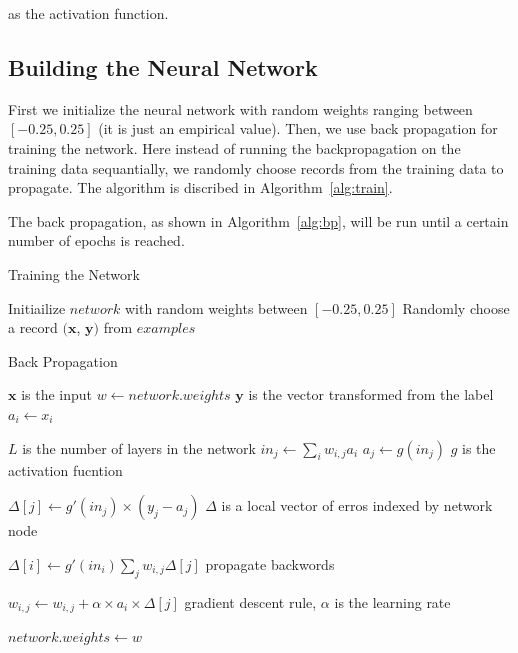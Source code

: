 \documentclass{article}
\begin{document}
as the activation function.

\subsection{Building the Neural Network}

First we initialize the neural network with random weights ranging between $[-0.25, 0.25]$ (it is just an empirical value). Then, we use back propagation for training the network. Here instead of running the backpropagation on the training data sequantially, we randomly choose records from the training data to propagate. The algorithm is discribed in Algorithm~\ref{alg:train}.

The back propagation, as shown in Algorithm~\ref{alg:bp}, will be run until a certain number of epochs is reached.

\begin{algorithm}[H]
\centering
\caption{Training the Network}
\label{alg:train}
  \begin{algorithmic}[1]
    	\State Initiailize $network$ with random weights between $[-0.25, 0.25]$
   	    	\State Randomly choose a record $(\mathbf{x}$, $\mathbf{y})$ from $examples$
   	    	\State {}
    	\EndFor
    \EndFunction
  \end{algorithmic}
\end{algorithm}

\begin{algorithm}[H]
\centering
\caption{Back Propagation}
\label{alg:bp}
  \begin{algorithmic}[1]
    	\Comment $\mathbf{x}$ is the input
    	\State $w \gets network.weights$ \Comment $\mathbf{y}$ is the vector transformed from the label
    		\State $a_i \gets x_i$
    	\EndFor
    	
    	  \Comment $L$ is the number of layers in the network
    			\State $in_j \gets \sum_i w_{i,j}a_i$
    			\State $a_j \gets g(in_j)$  \Comment $g$ is the activation fucntion
    		\EndFor
    	\EndFor

			\State $\Delta[j] \gets g'(in_j) \times (y_j - a_j)$
			\Comment $\Delta$ is a local vector of erros indexed by network node
		\EndFor
		
				\State $\Delta[i] \gets g'(in_i) \sum_j w_{i,j}\Delta[j]$
				\Comment propagate backwords
			\EndFor
		\EndFor
		
			\State $w_{i,j} \gets w_{i,j} + \alpha \times a_i \times \Delta[j]$  \Comment gradient descent rule, $\alpha$ is the learning rate
		\EndFor
		
		\State $network.weights \gets w$
    \EndFunction
  \end{algorithmic}
\end{algorithm}
\end{document}
